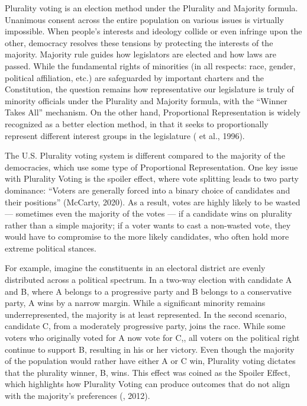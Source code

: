 \documentclass[12pt, a4paper, twoside]{article}
\begin{document}
Plurality voting is an election method under the Plurality and Majority formula. Unanimous consent across the entire population on various issues is virtually impossible. When people’s interests and ideology collide or even infringe upon the other, democracy resolves these tensions by protecting the interests of the majority. Majority rule guides how legislators are elected and how laws are passed. While the fundamental rights of minorities (in all respects: race, gender, political affiliation, etc.) are safeguarded by important charters and the Constitution, the question remains how representative our legislature is truly of minority officials under the Plurality and Majority formula, with the “Winner Takes All” mechanism. On the other hand, Proportional Representation is widely recognized as a better election method, in that it seeks to proportionally represent different interest groups in the legislature (\cite{mudambi1996} et al., 1996). 

The U.S. Plurality voting system is different compared to the majority of the democracies, which use some type of Proportional Representation. One key issue with Plurality Voting is the spoiler effect, where vote splitting leads to two party dominance: “Voters are generally forced into a binary choice of candidates and their positions” (McCarty, 2020). As a result, votes are highly likely to be wasted --- sometimes even the majority of the votes --- if a candidate wins on plurality rather than a simple majority; if a voter wants to cast a non-wasted vote, they would have to compromise to the more likely candidates, who often hold more extreme political stances. 

For example, imagine the constituents in an electoral district are evenly distributed across a political spectrum. In a two-way election with candidate A and B, where A belongs to a progressive party and B belongs to a conservative party, A wins by a narrow margin. While a significant minority remains underrepresented, the majority is at least represented. In the second scenario, candidate C, from a moderately progressive party, joins the race. While some voters who originally voted for A now vote for C,, all voters on the political right continue to support B, resulting in his or her victory. Even though the majority of the population would rather have either A or C win, Plurality voting dictates that the plurality winner, B, wins. This effect was coined as the Spoiler Effect, which highlights how Plurality Voting can produce outcomes that do not align with the majority’s preferences (\cite{maxmin2012}, 2012). 
\end{document}
